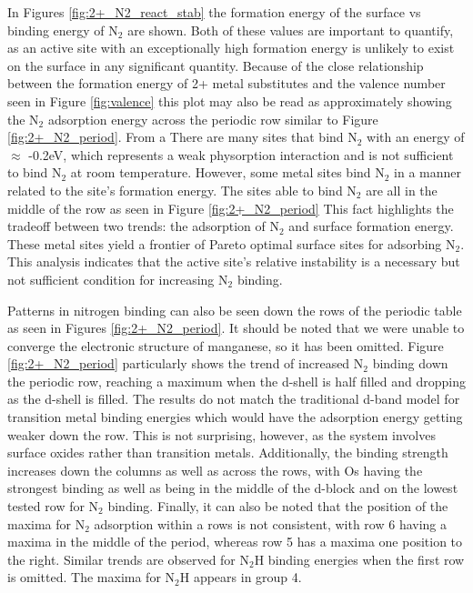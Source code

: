 \documentclass[catalysts,article,submit,moreauthors,pdftex,10pt,a4paper]{mdpi}
\theoremstyle{mdpi}
\newcounter{ex}
\newcounter{re}
\theoremstyle{mdpidefinition}
\begin{document}
In Figures \ref{fig:2+_N2_react_stab} the formation energy of the surface vs binding energy of N$_2$ are shown. Both of these values are important to quantify, as an active site with an exceptionally high formation energy is unlikely to exist on the surface in any significant quantity. Because of the close relationship between the formation energy of 2+ metal substitutes and the valence number seen in Figure \ref{fig:valence} this plot may also be read as approximately showing the N$_2$ adsorption energy across the periodic row similar to Figure \ref{fig:2+_N2_period}. From a There are many sites that bind N$_2$ with an energy of $\approx$ -0.2eV, which represents a weak physorption interaction and is not sufficient to bind N$_2$ at room temperature. However, some metal sites bind N$_2$ in a manner related to the site's formation energy. The sites able to bind N$_2$ are all in the middle of the row as seen in Figure \ref{fig:2+_N2_period} This fact highlights the tradeoff between two trends: the adsorption of N$_2$ and surface formation energy. These metal sites yield a frontier of Pareto optimal surface sites for adsorbing N$_2$. This analysis indicates that the active site's relative instability is a necessary but not sufficient condition for increasing N$_2$ binding.


Patterns in nitrogen binding can also be seen down the rows of the periodic table as seen in Figures \ref{fig:2+_N2_period}. It should be noted that we were unable to converge the electronic structure of manganese, so it has been omitted. Figure \ref{fig:2+_N2_period} particularly shows the trend of increased N$_2$ binding down the periodic row, reaching a maximum when the d-shell is half filled and dropping as the d-shell is filled. The results do not match the traditional d-band model\cite{Nilsson_2008} for transition metal binding energies which would have the adsorption energy getting weaker down the row. This is not surprising, however, as the system involves surface oxides rather than transition metals. Additionally, the binding strength increases down the columns as well as across the rows, with Os having the strongest binding as well as being in the middle of the d-block and on the lowest tested row for N$_2$ binding. Finally, it can also be noted that the position of the maxima for N$_2$ adsorption within a rows is not consistent, with row 6 having a maxima in the middle of the period, whereas row 5 has a maxima one position to the right. Similar trends are observed for N$_2$H binding energies when the first row is omitted. The maxima for N$_2$H appears in group 4.
\end{document}
